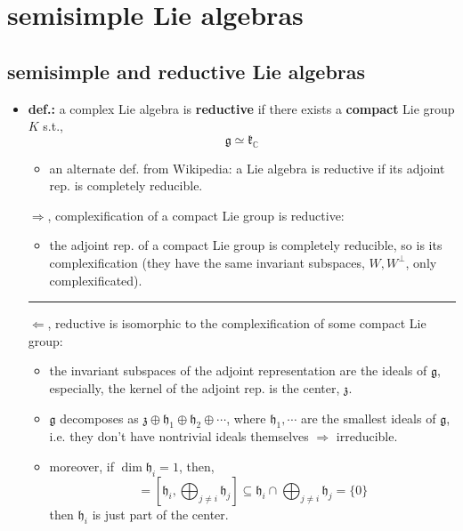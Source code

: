 \chapter{semisimple Lie algebras}
\section{semisimple and reductive Lie algebras}
\begin{itemize}
	\item \textbf{def.:} a complex Lie algebra is \textbf{reductive} if there exists a \textbf{compact} Lie group $K$ s.t.,
	\begin{equation} \label{6.1.1}
		\mathfrak{g} \simeq \mathfrak{k}_\mathbb{C}
	\end{equation}
	\begin{itemize}
		\item an alternate def. from Wikipedia: a Lie algebra is reductive if its adjoint rep. is completely reducible.
	\end{itemize}
	
	\begin{tcolorbox}[title=proof of equivalence:]
		$\Longrightarrow$, complexification of a compact Lie group is reductive:
		\begin{itemize}
			\item the adjoint rep. of a compact Lie group is completely reducible, so is its complexification (they have the same invariant subspaces, $W, W^\perp$, only complexificated).
		\end{itemize}
		
		\noindent\rule[0.5ex]{\linewidth}{0.5pt} %
		
		$\Longleftarrow$, reductive is isomorphic to the complexification of some compact Lie group:
		\begin{itemize}
			\item the invariant subspaces of the adjoint representation are the ideals of $\mathfrak{g}$, especially, the kernel of the adjoint rep. is the center, $\mathfrak{z}$.
			
			\item $\mathfrak{g}$ decomposes as $\mathfrak{z} \oplus \mathfrak{h}_1 \oplus \mathfrak{h}_2 \oplus \cdots$, where $\mathfrak{h}_1, \cdots$ are the smallest ideals of $\mathfrak{g}$, i.e. they don't have nontrivial ideals themselves $\Longrightarrow$ irreducible.
			
			\item moreover, if $\dim \mathfrak{h}_i = 1$, then,
			\begin{equation}
				[\mathfrak{h}_i, \mathfrak{z} \oplus \bigoplus_{j \neq i} \mathfrak{h}_j] = [\mathfrak{h}_i, \bigoplus_{j \neq i} \mathfrak{h}_j] \subseteq \mathfrak{h}_i \cap \bigoplus_{j \neq i} \mathfrak{h}_j = \{0\}
			\end{equation}
			then $\mathfrak{h}_i$ is just part of the center.
			

\end{itemize}
\end{tcolorbox}
\end{itemize}
